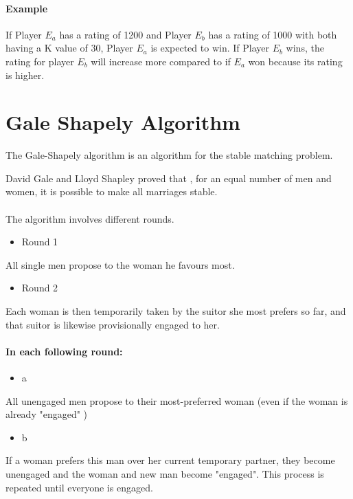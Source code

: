 \paragraph{Example} If Player $E_a$ has a rating of 1200 and Player $E_b$ has a rating of 1000 with both having a K value of 30, Player $E_a$ is expected to win. If Player $E_b$ wins, the rating for player $E_b$ will increase more compared to if $E_a$ won because its rating is higher.\vfill

\section{Gale Shapely Algorithm}
The Gale-Shapely algorithm \cite{dubins1981machiavelli} is an algorithm for the stable matching problem. \cite{gale1985some}


David Gale and Lloyd Shapley proved that \cite{gale1962college}, for an equal number of men and women, it is possible to make all marriages stable. 

\paragraph{}
The algorithm involves different rounds.

\begin{itemize}
	\item Round 1
\end{itemize}
All single men propose to the woman he favours most.
\begin{itemize}
	\item Round 2
\end{itemize}
Each woman is then temporarily taken by the suitor she most prefers so far, and that suitor is likewise provisionally engaged to her.
\paragraph{In each following round:}
\begin{itemize}
	\item a
\end{itemize}
All unengaged men propose to their most-preferred woman (even if the woman is already "engaged" )
\begin{itemize}
	\item b
\end{itemize}
If a woman prefers this man over her current temporary partner, they become unengaged and the woman and new man become "engaged".
This process is repeated until everyone is engaged.


